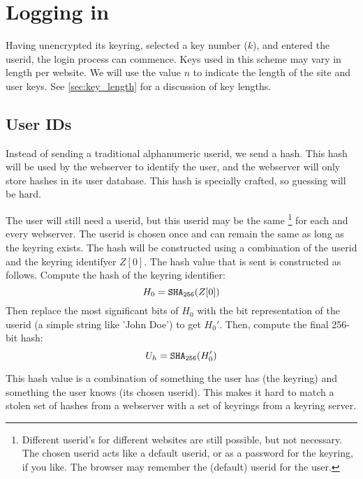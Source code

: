 %
%
%
\section{Logging in}
\label{logging_in}
Having unencrypted its keyring, selected a key number ($k$), and entered the userid, the login process can commence.
Keys used in this scheme may vary in length per website.
We will use the value $n$ to indicate the length of the site and user keys.
See \vref{sec:key_length} for a discussion of key lengths.
\subsection{User IDs}
\label{sec:user_ids}
Instead of sending a traditional alphanumeric userid,
we send a hash.
This hash will be used by the webserver to identify the user,
and the webserver will only store hashes in its user database.
This hash is specially crafted,
so guessing will be hard.
\par
The user will still need a userid,
but this userid may be the same%
\footnote{Different userid's for different websites are still possible, but not necessary.
The chosen userid acts like a default userid, or as a password for the keyring, if you like.
The browser may remember the (default) userid for the user.}
for each and every webserver.
The userid is chosen once and can remain the same as long as the keyring exists.
The hash will be constructed using a combination of the userid and the keyring identifyer $Z[0]$.
The hash value that is sent is constructed as follows.
Compute the hash of the keyring identifier:
\[H_0=\texttt{\ensuremath{\mathtt{SHA_{256}}}}(Z[0])\]
Then replace the most significant bits of $H_0$ with the bit representation of the userid
(a simple string like 'John Doe')
to get $H_0'$.
Then, compute the final 256-bit hash:
\[U_h=\texttt{\ensuremath{\mathtt{SHA_{256}}}}(H_0')\]
\par
This hash value is a combination of something the user has
(the keyring)
and something the user knows
(its chosen userid).
This makes it hard to match a stolen set of hashes from a webserver with a set of keyrings from a keyring server.

